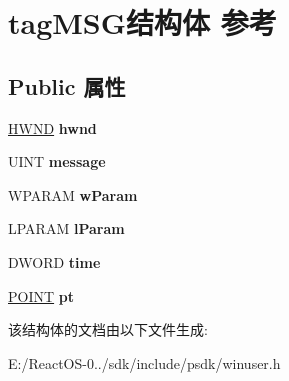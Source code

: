 \hypertarget{structtag_m_s_g}{}\section{tag\+M\+S\+G结构体 参考}
\label{structtag_m_s_g}
\subsection*{Public 属性}
\begin{DoxyCompactItemize}
\item 
\mbox{\label{structtag_m_s_g_a0de51bd4b5e86698412757ec88c475aa}} 
\hyperlink{interfacevoid}{H\+W\+ND} {\bfseries hwnd}
\item 
\mbox{\label{structtag_m_s_g_a0ae6c01418c15225aefe35da72fc00cf}} 
U\+I\+NT {\bfseries message}
\item 
\mbox{\label{structtag_m_s_g_a63da8b3cd48e5e2225ce56255a2ce0bc}} 
W\+P\+A\+R\+AM {\bfseries w\+Param}
\item 
\mbox{\label{structtag_m_s_g_a736c4134d5346ca58e9b07cfc1b175b3}} 
L\+P\+A\+R\+AM {\bfseries l\+Param}
\item 
\mbox{\label{structtag_m_s_g_a2e64a90d5f76ad7abd4c6e48a4ba38a4}} 
D\+W\+O\+RD {\bfseries time}
\item 
\mbox{\label{structtag_m_s_g_a796803672668d4b5a9dd42fe6bafd0ca}} 
\hyperlink{structtag_p_o_i_n_t}{P\+O\+I\+NT} {\bfseries pt}
\end{DoxyCompactItemize}


该结构体的文档由以下文件生成\+:\begin{DoxyCompactItemize}
\item 
E\+:/\+React\+O\+S-\/0../sdk/include/psdk/winuser.\+h\end{DoxyCompactItemize}
